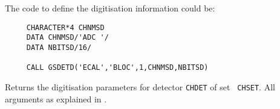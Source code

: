 The code to define the digitisation information could be:
\begin{verbatim}
     CHARACTER*4 CHNMSD
     DATA CHNMSD/'ADC '/ 
     DATA NBITSD/16/    
 
     CALL GSDETD('ECAL','BLOC',1,CHNMSD,NBITSD)
\end{verbatim}

Returns the digitisation parameters for detector {\tt CHDET} of set {\tt
CHSET}.  All arguments as explained in .
 
